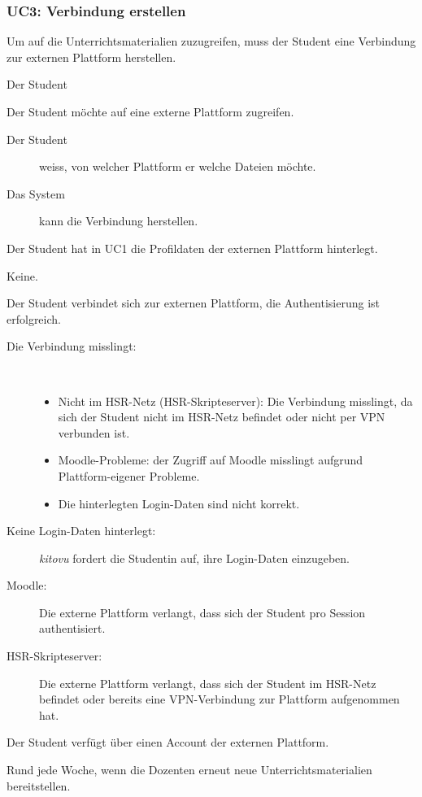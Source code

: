 \documentclass[a4paper]{article}
\begin{document}
\subsubsection{UC3: Verbindung erstellen}
\begin{description}[uclist]
  \item[Goal] Um auf die Unterrichtsmaterialien zuzugreifen, muss der Student eine Verbindung zur externen Plattform herstellen.
  \item[Primary Actor] Der Student
  \item[Trigger] Der Student möchte auf eine externe Plattform zugreifen.
  \item[Stakeholders and Interests]
    \begin{description}
      \item[Der Student] weiss, von welcher Plattform er welche Dateien möchte.
      \item[Das System] kann die Verbindung herstellen.
    \end{description}
  \item[Preconditions] Der Student hat in UC1 die Profildaten der externen Plattform hinterlegt.
  \item[Postconditions] Keine.
  \item[Main Success Scenario] Der Student verbindet sich zur externen Plattform, die Authentisierung ist erfolgreich.
  \item[Extensions]
    \begin{description}
      \item[Die Verbindung misslingt:] \strut \\[-1em]
        \begin{itemize}[leftmargin=1em]
          \item Nicht im HSR-Netz (HSR-Skripteserver): Die Verbindung misslingt, da sich der Student nicht im HSR-Netz befindet oder nicht per VPN verbunden ist.
          \item Moodle-Probleme: der Zugriff auf Moodle misslingt aufgrund Plattform-eigener Probleme.
          \item Die hinterlegten Login-Daten sind nicht korrekt.
        \end{itemize}
      \item[Keine Login-Daten hinterlegt:] \emph{kitovu} fordert die Studentin auf, ihre Login-Daten einzugeben.
      \item[Moodle:] Die externe Plattform verlangt, dass sich der Student pro Session authentisiert.
      \item[HSR-Skripteserver:] Die externe Plattform verlangt, dass sich der Student im HSR-Netz befindet oder bereits eine VPN-Verbindung zur Plattform aufgenommen hat.
    \end{description}
  \item[Special Requirements] Der Student verfügt über einen Account der externen Plattform.
  \item[Frequency of Occurrence] Rund jede Woche, wenn die Dozenten erneut neue Unterrichtsmaterialien bereitstellen.
\end{description}
\end{document}
